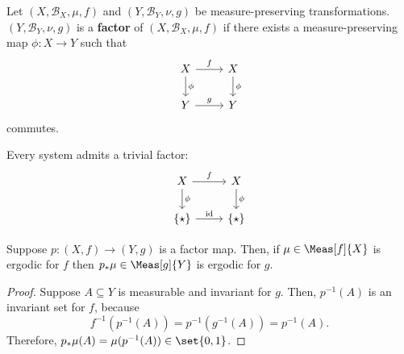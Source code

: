 \documentclass[../main]{subfiles}
\begin{document}
\begin{definition} Let $(X, \mathcal{B}_X, \mu, f)$ and $(Y,\mathcal{B}_Y, \nu, g)$ be measure-preserving transformations. 
  $(Y,\mathcal{B}_Y, \nu, g)$ is a \textbf{factor} of $(X, \mathcal{B}_X, \mu, f)$ if there exists a measure-preserving map $\phi: X \to Y$ such that 
  \[
    \begin{tikzcd}
      X \arrow[r, "f"] \arrow[d, "\phi"] & X \arrow[d, "\phi"] \\
      Y \arrow[r, "g"] & Y
    \end{tikzcd}
  \]
  commutes.
\end{definition}
  

\begin{example}
  Every system admits a trivial factor:
  \[
    \begin{tikzcd}
      X \arrow[r, "f"] \arrow[d, "\phi"] & X \arrow[d, "\phi"] \\
      \{ \star \} \arrow[r, "\text{id}"] & \{ \star \}
    \end{tikzcd}
  \]
\end{example}

\begin{lemma}\label{lem:factor-ergodic}
  Suppose \(p \colon (X, f) \to (Y, g)\) is a factor map. Then, if \(\mu \in \Meas[f]{X}\) is ergodic for \(f\) then \(p_*\mu \in \Meas[g]{Y}\) is ergodic for \(g\).
\end{lemma}

\begin{proof}
  Suppose \(A \subseteq Y\) is measurable and invariant for \(g\). Then, \(p^{-1}(A)\) is an invariant set for \(f\), because \[f^{-1}(p^{-1}(A)) = p^{-1}(g^{-1}(A)) = p^{-1}(A).\]
  Therefore, \(p_*\mu(A) = \mu(p^{-1}(A)) \in \set{0,1}\).
\end{proof}



\end{document}
